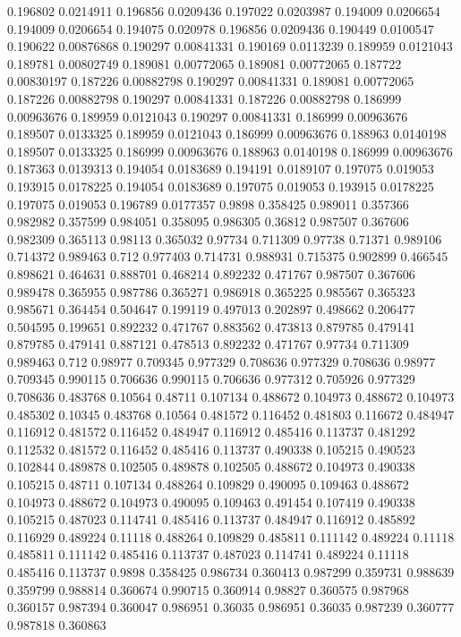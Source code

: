 0.196802 0.0214911
0.196856 0.0209436
0.197022 0.0203987
0.194009 0.0206654
0.194009 0.0206654
0.194075 0.020978
0.196856 0.0209436
0.190449 0.0100547
0.190622 0.00876868
0.190297 0.00841331
0.190169 0.0113239
0.189959 0.0121043
0.189781 0.00802749
0.189081 0.00772065
0.189081 0.00772065
0.187722 0.00830197
0.187226 0.00882798
0.190297 0.00841331
0.189081 0.00772065
0.187226 0.00882798
0.190297 0.00841331
0.187226 0.00882798
0.186999 0.00963676
0.189959 0.0121043
0.190297 0.00841331
0.186999 0.00963676
0.189507 0.0133325
0.189959 0.0121043
0.186999 0.00963676
0.188963 0.0140198
0.189507 0.0133325
0.186999 0.00963676
0.188963 0.0140198
0.186999 0.00963676
0.187363 0.0139313
0.194054 0.0183689
0.194191 0.0189107
0.197075 0.019053
0.193915 0.0178225
0.194054 0.0183689
0.197075 0.019053
0.193915 0.0178225
0.197075 0.019053
0.196789 0.0177357
0.9898 0.358425
0.989011 0.357366
0.982982 0.357599
0.984051 0.358095
0.986305 0.36812
0.987507 0.367606
0.982309 0.365113
0.98113 0.365032
0.97734 0.711309
0.97738 0.71371
0.989106 0.714372
0.989463 0.712
0.977403 0.714731
0.988931 0.715375
0.902899 0.466545
0.898621 0.464631
0.888701 0.468214
0.892232 0.471767
0.987507 0.367606
0.989478 0.365955
0.987786 0.365271
0.986918 0.365225
0.985567 0.365323
0.985671 0.364454
0.504647 0.199119
0.497013 0.202897
0.498662 0.206477
0.504595 0.199651
0.892232 0.471767
0.883562 0.473813
0.879785 0.479141
0.879785 0.479141
0.887121 0.478513
0.892232 0.471767
0.97734 0.711309
0.989463 0.712
0.98977 0.709345
0.977329 0.708636
0.977329 0.708636
0.98977 0.709345
0.990115 0.706636
0.990115 0.706636
0.977312 0.705926
0.977329 0.708636
0.483768 0.10564
0.48711 0.107134
0.488672 0.104973
0.488672 0.104973
0.485302 0.10345
0.483768 0.10564
0.481572 0.116452
0.481803 0.116672
0.484947 0.116912
0.481572 0.116452
0.484947 0.116912
0.485416 0.113737
0.481292 0.112532
0.481572 0.116452
0.485416 0.113737
0.490338 0.105215
0.490523 0.102844
0.489878 0.102505
0.489878 0.102505
0.488672 0.104973
0.490338 0.105215
0.48711 0.107134
0.488264 0.109829
0.490095 0.109463
0.488672 0.104973
0.488672 0.104973
0.490095 0.109463
0.491454 0.107419
0.490338 0.105215
0.487023 0.114741
0.485416 0.113737
0.484947 0.116912
0.485892 0.116929
0.489224 0.11118
0.488264 0.109829
0.485811 0.111142
0.489224 0.11118
0.485811 0.111142
0.485416 0.113737
0.487023 0.114741
0.489224 0.11118
0.485416 0.113737
0.9898 0.358425
0.986734 0.360413
0.987299 0.359731
0.988639 0.359799
0.988814 0.360674
0.990715 0.360914
0.98827 0.360575
0.987968 0.360157
0.987394 0.360047
0.986951 0.36035
0.986951 0.36035
0.987239 0.360777
0.987818 0.360863

